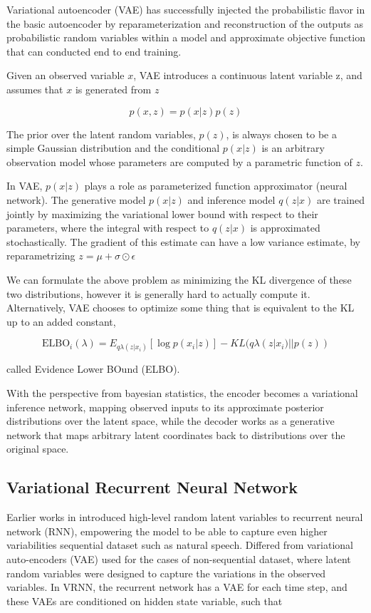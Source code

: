 \documentclass{article}
\begin{document}
Variational autoencoder (VAE) \cite{vae} has successfully injected the probabilistic flavor in the basic autoencoder by reparameterization and reconstruction of the outputs as probabilistic random variables within a model and approximate objective function that can conducted end to end training.

Given an observed variable $x$, VAE introduces a continuous latent variable z, and assumes that $x$ is generated from $z$

$$p(x,z) = p(x|z)p(z)$$

The prior over the latent random variables, $p(z)$, is always chosen to be a simple Gaussian distribution and the conditional $p(x|z)$ is an arbitrary observation model whose parameters are computed by a parametric function of $z$. 

In VAE, $p(x|z)$ plays a role as parameterized function approximator (neural network). The generative model $p(x|z)$ and inference model $q(z|x)$ are trained jointly by maximizing the variational lower bound with respect to their parameters, where the integral with respect to $q(z|x)$ is approximated stochastically. The gradient of this estimate can have a low variance estimate, by reparametrizing $z = \mu+\sigma\odot\epsilon$

We can formulate the above problem as minimizing the KL divergence of these two distributions, however it is generally hard to actually compute it. Alternatively, VAE chooses to optimize some thing that is equivalent to the KL up to an added constant,

$$\text{ELBO}_i (\lambda) = E_{q\lambda (z|x_i)}[\log p(x_i|z)]-KL(q\lambda (z|x_i)||p(z))$$ 

called Evidence Lower BOund (ELBO).

With the perspective from bayesian statistics, the encoder becomes a variational inference network, mapping observed inputs to its approximate posterior distributions over the latent space, while the decoder works as a generative network that maps arbitrary latent coordinates back to distributions over the original space.


\subsection{Variational Recurrent Neural Network}
Earlier works in \cite{vrnn} introduced high-level random latent variables to recurrent neural network (RNN), empowering the model to be able to capture even higher variabilities sequential dataset such as natural speech. Differed from variational auto-encoders (VAE) used for the cases of non-sequential dataset, where latent random variables were designed to capture the variations in the observed variables. In VRNN, the recurrent network has a VAE for each time step, and these VAEs are conditioned on hidden state variable, such that
\end{document}
